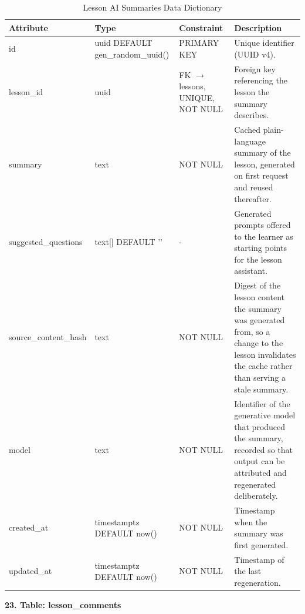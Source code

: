 \documentclass[12pt, oneside]{article} %
\newcommand{\tabbreak}{\hyphenpenalty=200\exhyphenpenalty=200\tolerance=4000\hbadness=10000\hspace{0pt}}
\begin{document}
\begin{table}[H]
\caption{Lesson AI Summaries Data Dictionary}
\label{tab:dd_lesson_ai_summaries}
\vspace{-4mm}
\begin{center}
\renewcommand{\arraystretch}{1.15}
\scriptsize
\begin{tabular}{|>{\raggedright\arraybackslash\tabbreak}p{2.67cm}|>{\raggedright\arraybackslash\tabbreak}p{2.93cm}|>{\raggedright\arraybackslash\tabbreak}p{2.67cm}|>{\raggedright\arraybackslash\tabbreak}p{4.51cm}|}
\hline
\textbf{Attribute} & \textbf{Type} & \textbf{Constraint} & \textbf{Description} \\ \hline
id & uuid DEFAULT gen\_random\_uuid() & PRIMARY KEY & Unique identifier (UUID v4). \\ \hline
lesson\_id & uuid & FK $\rightarrow$ lessons, UNIQUE, NOT NULL & Foreign key referencing the lesson the summary describes. \\ \hline
summary & text & NOT NULL & Cached plain-language summary of the lesson, generated on first request and reused thereafter. \\ \hline
suggested\_questions & text[] DEFAULT '{}' & - & Generated prompts offered to the learner as starting points for the lesson assistant. \\ \hline
source\_content\_hash & text & NOT NULL & Digest of the lesson content the summary was generated from, so a change to the lesson invalidates the cache rather than serving a stale summary. \\ \hline
model & text & NOT NULL & Identifier of the generative model that produced the summary, recorded so that output can be attributed and regenerated deliberately. \\ \hline
created\_at & timestamptz DEFAULT now() & NOT NULL & Timestamp when the summary was first generated. \\ \hline
updated\_at & timestamptz DEFAULT now() & NOT NULL & Timestamp of the last regeneration. \\ \hline
\end{tabular}
\end{center}
\end{table}

\textbf{23. Table: lesson\_comments}
\end{document}

